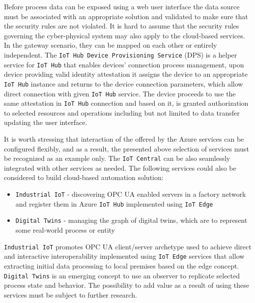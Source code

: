 \documentclass{jacsart}
\providecommand{\tightlist} { \setlength{\itemsep}{0pt}\setlength{\parskip}{0pt}}
\begin{document}
Before process data can be exposed using a web user interface the data
source must be associated with an appropriate solution and validated to
make sure that the security rules are not violated. It is hard to assume
that the security rules governing the cyber-physical system may also
apply to the cloud-based services. In the gateway scenario, they can be
mapped on each other or entirely independent. The
\texttt{IoT\ Hub\ Device\ Provisioning\ Service} (DPS) is a helper
service for \texttt{IoT\ Hub} that enables devices' connection process
management, upon device providing valid identity attestation it assigns
the device to an appropriate \texttt{IoT\ Hub} instance and returns to
the device connection parameters, which allow direct connection with
given \texttt{IoT\ Hub} service. The device proceeds to use the same
attestation in \texttt{IoT\ Hub} connection and based on it, is granted
authorization to selected resources  and operations including but not limited to data transfer updating the user interface.

It is worth stressing that interaction of the offered by the Azure
services can be configured flexibly, and as a result, the presented
above selection of services must be recognized as an example only. The
\texttt{IoT\ Central} can be also seamlessly integrated with other
services as needed. The following services could also be considered to
build cloud-based automation solution:

\begin{itemize}
  \tightlist
  \item
        \texttt{Industrial\ IoT} - discovering OPC UA enabled servers in a factory network and register them in Azure \texttt{IoT\ Hub} implemented using \texttt{IoT\ Edge}
  \item
        \texttt{Digital\ Twins} - managing the graph of digital twins, which are to represent some real-world process or entity
\end{itemize}

\texttt{Industrial\ IoT} promotes OPC UA client/server archetype used to
achieve direct and interactive interoperability implemented using
\texttt{IoT\ Edge} services that allow extracting initial data
processing to local premises based on the edge concept.
\texttt{Digital\ Twins} is an emerging concept to use an observer to
replicate selected process state and behavior. The possibility to add
value as a result of using these services must be subject to further
research.
\end{document}
